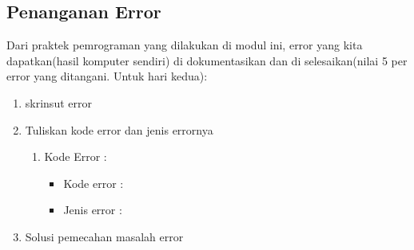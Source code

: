 \subsection{Penanganan Error}
Dari praktek pemrograman yang dilakukan di modul ini, error yang kita dapatkan(hasil komputer sendiri) di dokumentasikan dan di selesaikan(nilai 5 per error yang ditangani. Untuk hari kedua):

\begin{enumerate}
	\item skrinsut error
		
		
	\item Tuliskan kode error dan jenis errornya
		\begin{enumerate}
		\item Kode Error  :
			\begin{itemize}
				\item Kode error : 
				\item Jenis error :
			\end{itemize}
		\end{enumerate}

	\item Solusi pemecahan masalah error
		
		
\end{enumerate}